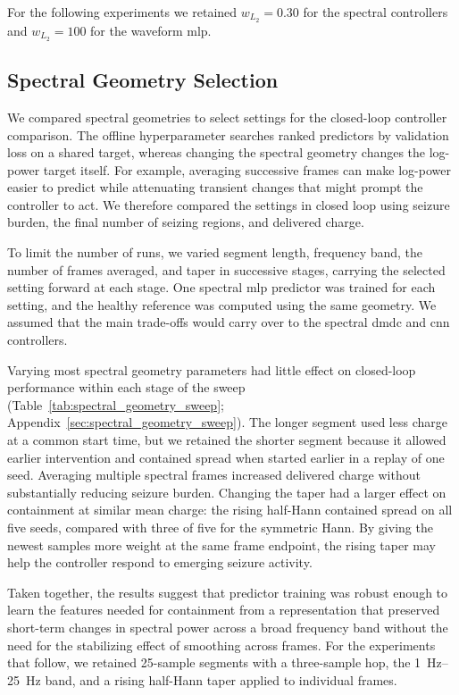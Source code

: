 For the following experiments we retained \mbox{$w_{L_2}=0.30$} for the spectral controllers and \mbox{$w_{L_2}=100$} for the waveform \ac{mlp}.

\subsection{Spectral Geometry Selection}

We compared spectral geometries to select settings for the closed-loop controller comparison.
The offline hyperparameter searches ranked predictors by validation loss on a shared target, whereas changing the spectral geometry changes the log-power target itself.
For example, averaging successive frames can make log-power easier to predict while attenuating transient changes that might prompt the controller to act.
We therefore compared the settings in closed loop using seizure burden, the final number of seizing regions, and delivered charge.

To limit the number of runs, we varied segment length, frequency band, the number of frames averaged, and taper in successive stages, carrying the selected setting forward at each stage.
One spectral \ac{mlp} predictor was trained for each setting, and the healthy reference was computed using the same geometry.
We assumed that the main trade-offs would carry over to the spectral \ac{dmdc} and \ac{cnn} controllers.

Varying most spectral geometry parameters had little effect on closed-loop performance within each stage of the sweep (Table~\ref{tab:spectral_geometry_sweep}; Appendix~\ref{sec:spectral_geometry_sweep}). %
The longer segment used less charge at a common start time, but we retained the shorter segment because it allowed earlier intervention and contained spread when started earlier in a replay of one seed.
Averaging multiple spectral frames increased delivered charge without substantially reducing seizure burden.
Changing the taper had a larger effect on containment at similar mean charge: the rising half-Hann contained spread on all five seeds, compared with three of five for the symmetric Hann.
By giving the newest samples more weight at the same frame endpoint, the rising taper may help the controller respond to emerging seizure activity.

Taken together, the results suggest that predictor training was robust enough to learn the features needed for containment from a representation that preserved short-term changes in spectral power across a broad frequency band without the need for the stabilizing effect of smoothing across frames.
For the experiments that follow, we retained 25-sample segments with a three-sample hop, the \SIrange{1}{25}{\hertz} band, and a rising half-Hann taper applied to individual frames.

